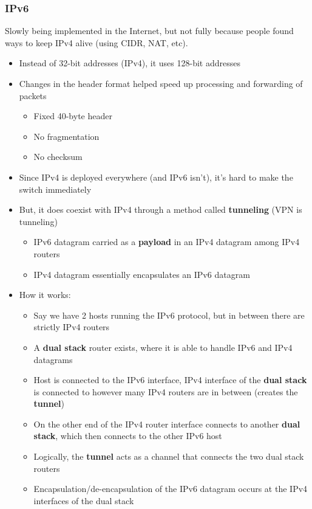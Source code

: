 \documentclass{article}
\begin{document}
\subsubsection{IPv6}
Slowly being implemented in the Internet, but not fully because people found ways to keep IPv4 alive
(using CIDR, NAT, etc).
\begin{itemize}
    \item Instead of 32-bit addresses (IPv4), it uses 128-bit addresses
    \item Changes in the header format helped speed up processing and forwarding of packets
    \begin{itemize}
        \item Fixed 40-byte header
        \item No fragmentation
        \item No checksum
    \end{itemize}
    \item Since IPv4 is deployed everywhere (and IPv6 isn't), it's hard to make the switch immediately
    \item But, it does coexist with IPv4 through a method called \textbf{tunneling} (VPN is tunneling)
    \begin{itemize}
        \item IPv6 datagram carried as a \textbf{payload} in an IPv4 datagram among IPv4 routers
        \item IPv4 datagram essentially encapsulates an IPv6 datagram
    \end{itemize}
    \item How it works:
    \begin{itemize}
        \item Say we have 2 hosts running the IPv6 protocol, but in between there are strictly IPv4 routers
        \item A \textbf{dual stack} router exists, where it is able to handle IPv6 and IPv4 datagrams
        \item Host is connected to the IPv6 interface, IPv4 interface of the \textbf{dual stack} is connected
        to however many IPv4 routers are in between (creates the \textbf{tunnel})
        \item On the other end of the IPv4 router interface connects to another \textbf{dual stack}, which
        then connects to the other IPv6 host
        \item Logically, the \textbf{tunnel} acts as a channel that connects the two dual stack routers
        \item Encapsulation/de-encapsulation of the IPv6 datagram occurs at the IPv4 interfaces of the dual stack
    \end{itemize}
\end{itemize}
\newpage
\end{document}
